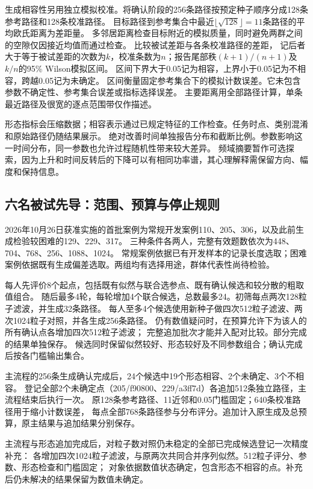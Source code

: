 \documentclass[11pt,a4paper]{article}
\numberwithin{equation}{section}
\begin{document}
生成相容性另用独立模拟校准。将确认阶段的256条路径按预定种子顺序分成128条参考路径和128条校准路径。
目标路径到参考集合中最近$\lfloor\sqrt{128}\rfloor=11$条路径的平均欧氏距离为差距量。
多邻居距离检查目标附近的模拟质量，同时避免两群之间的空隙仅因接近均值而通过检查。
比较被试差距与各条校准路径的差距，
记后者大于等于被试差距的次数为$k$，校准条数为$n$；报告尾部秩$(k+1)/(n+1)$及$k/n$的95\% Wilson模拟区间。
区间下界大于0.05记为相容，上界小于0.05记为不相容，跨越0.05记为未确定。
区间衡量固定参考集合下的模拟计数误差。它未包含参数不确定性、参考集合误差或指标选择误差。
主要距离用全部路径计算，单条最近路径及很宽的逐点范围带仅作描述。

形态指标会压缩数据；相容表示通过已规定特征的工作检查。任务时点、类别混淆和原始路径仍随结果展示。
绝对改善时间单独报告分布和截断比例。参数影响这一时间分布，同一参数也允许过程随机性带来较大差异。
频域摘要暂作可选探索，因为上升和时间反转后的下降可以有相同功率谱，其心理解释需保留方向、幅度和保持信息。

\subsection{六名被试先导：范围、预算与停止规则}
2026年10月26日获准实施的首批案例为常规开发案例110、205、306，以及此前生成检验较困难的129、229、317。
三种条件各两人，完整有效题数依次为448、704、768、256、1088、1024。
常规案例依据已有开发样本的记录长度选取；困难案例依据既有生成偏差选取。两组均有选择用途，群体代表性尚待检验。

每人先评价8个起点，包括既有似然与联合选参点、既有确认候选和较分散的粗取值组合。
随后最多4轮，每轮增加4个联合候选，总数最多24。初筛每点两次128粒子滤波，并生成32条路径。
每人至多4个候选使用新种子做四次512粒子滤波、两次1024粒子对照，并各生成256条路径。
仍有数值疑问时，在预算允许下为该人的所有确认点各增加四次512粒子滤波；
完整追加批次才能并入配对比较。部分完成的结果单独保存。
候选同时保留似然较好、形态较好及不同参数组合；确认完成后按各门槛输出集合。

主流程的256条生成确认完成后，24个候选中19个形态相容、2个未确定、3个不相容。
登记全部2个未确定点（205/f90800、229/a3ff7d）各追加512条独立路径，主流程结束后执行一次。
原128条参考路径、11近邻和0.05门槛固定；640条校准路径用于缩小计数误差，
每点全部768条路径参与分布评分。追加计入原生成及总预算，原主结果与追加结果分别保存。

主流程与形态追加完成后，对粒子数对照仍未稳定的全部已完成候选登记一次精度补充：
各增加四次1024粒子滤波，与原两次共同合并序列似然。512粒子评分、参数、形态检查和门槛固定；
对象依据数值状态确定，包含形态不相容的点。补充后仍未解决的结果保留为数值未确定。
\end{document}
